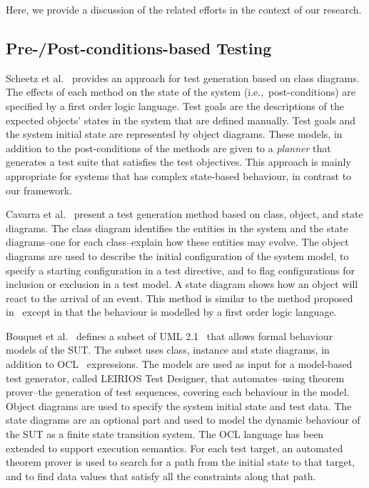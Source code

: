 %
%
\label{sec:related-work}
Here, we provide a discussion of the related efforts in the context of our research.

\subsection{Pre-/Post-conditions-based Testing}
\label{sec:relatd-pre-post}
Scheetz et al.~\cite{Scheetz1999} provides an approach for test generation based on class diagrams. The effects of each method on the state of the system (i.e.,\ post-conditions) are specified by a first order logic language. Test goals are the descriptions of the expected objects' states in the system that are defined manually. Test goals and the system initial state are represented by object diagrams. These models, in addition to the post-conditions of the methods are given to a \textit{planner} that generates a test suite that satisfies the test objectives. This approach is mainly appropriate for systems that has complex state-based behaviour, in contrast to our framework.

Cavarra et al.~\cite{Cavarra2002} present a test generation method based on class, object, and state diagrams. The class diagram identifies the entities in the system and the state diagrams--one for each class--explain how these entities may evolve. The object diagrams are used to describe the initial configuration of the system model, to specify a starting configuration in a test directive, and to flag configurations for inclusion or exclusion in a test model. A state diagram shows how an object will react to the arrival of an event. This method is similar to the method proposed in~\cite{Scheetz1999} except in that the behaviour is modelled by a first order logic language.

Bouquet et al.~\cite{Bouquet2007} defines a subset of UML 2.1~\cite{UML2} that allows formal behaviour models of the SUT. The subset uses class, instance and state diagrams, in addition to OCL~\cite{OCL} expressions. The models are used as input for a model-based test generator, called LEIRIOS Test Designer, that automates--using theorem prover--the generation of test sequences, covering each behaviour in the model. Object diagrams are used to specify the system initial state and test data. The state diagrams are an optional part and used to model the dynamic behaviour of the SUT as a finite state transition system. The OCL language has been extended to support execution semantics. For each test target, an automated theorem prover is used to search for a path from the initial state to that target, and to find data values that satisfy all the constraints along that path. 

